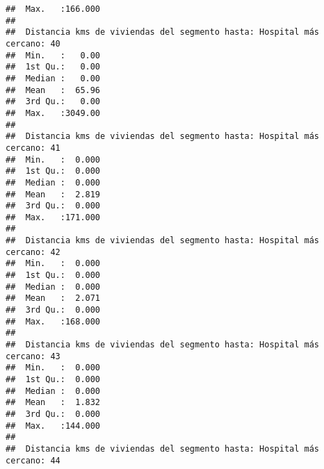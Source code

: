 \documentclass[11pt,]{article}
\begin{document}
\begin{verbatim}
##  Max.   :166.000                                                        
##                                                                         
##  Distancia kms de viviendas del segmento hasta: Hospital más cercano: 40
##  Min.   :   0.00                                                        
##  1st Qu.:   0.00                                                        
##  Median :   0.00                                                        
##  Mean   :  65.96                                                        
##  3rd Qu.:   0.00                                                        
##  Max.   :3049.00                                                        
##                                                                         
##  Distancia kms de viviendas del segmento hasta: Hospital más cercano: 41
##  Min.   :  0.000                                                        
##  1st Qu.:  0.000                                                        
##  Median :  0.000                                                        
##  Mean   :  2.819                                                        
##  3rd Qu.:  0.000                                                        
##  Max.   :171.000                                                        
##                                                                         
##  Distancia kms de viviendas del segmento hasta: Hospital más cercano: 42
##  Min.   :  0.000                                                        
##  1st Qu.:  0.000                                                        
##  Median :  0.000                                                        
##  Mean   :  2.071                                                        
##  3rd Qu.:  0.000                                                        
##  Max.   :168.000                                                        
##                                                                         
##  Distancia kms de viviendas del segmento hasta: Hospital más cercano: 43
##  Min.   :  0.000                                                        
##  1st Qu.:  0.000                                                        
##  Median :  0.000                                                        
##  Mean   :  1.832                                                        
##  3rd Qu.:  0.000                                                        
##  Max.   :144.000                                                        
##                                                                         
##  Distancia kms de viviendas del segmento hasta: Hospital más cercano: 44

\end{verbatim}
\end{document}
